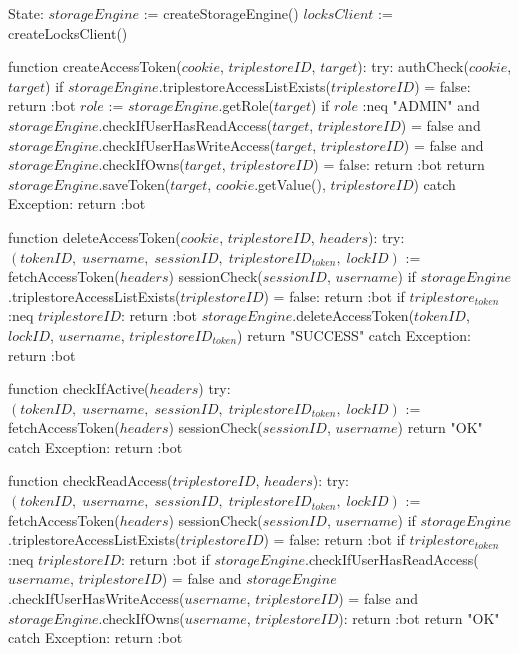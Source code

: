 State:
    $storageEngine$ := createStorageEngine()
    $locksClient$ := createLocksClient()

function createAccessToken($cookie$, $triplestoreID$, $target$):
    try: 
        authCheck($cookie$, $target$)
        if $storageEngine$.triplestoreAccessListExists($triplestoreID$) = false:
            return :bot
        $role$ := $storageEngine$.getRole($target$)
        if $role$ :neq "ADMIN" and $storageEngine$.checkIfUserHasReadAccess($target$, $triplestoreID$) = false and $storageEngine$.checkIfUserHasWriteAccess($target$, $triplestoreID$) = false and $storageEngine$.checkIfOwns($target$, $triplestoreID$) = false:
            return :bot
        return $storageEngine$.saveToken($target$, $cookie$.getValue(), $triplestoreID$)
    catch Exception:
        return :bot

function deleteAccessToken($cookie$, $triplestoreID$, $headers$):
    try: 
        $(tokenID, \; username, \; sessionID, \; triplestoreID_{token}, \; lockID)$ := fetchAccessToken($headers$)
        sessionCheck($sessionID$, $username$)
        if $storageEngine$.triplestoreAccessListExists($triplestoreID$) = false:
            return :bot
        if $triplestore_{token}$ :neq $triplestoreID$:
            return :bot
        $storageEngine$.deleteAccessToken($tokenID$, $lockID$, $username$, $triplestoreID_{token}$)
        return "SUCCESS"
    catch Exception: 
        return :bot

function checkIfActive($headers$) 
    try: 
        $(tokenID, \; username, \; sessionID, \; triplestoreID_{token}, \; lockID)$ := fetchAccessToken($headers$)
        sessionCheck($sessionID$, $username$)
        return "OK"
    catch Exception:
        return :bot

function checkReadAccess($triplestoreID$, $headers$):
    try: 
        $(tokenID, \; username, \; sessionID, \; triplestoreID_{token}, \; lockID)$ := fetchAccessToken($headers$)
        sessionCheck($sessionID$, $username$)
        if $storageEngine$.triplestoreAccessListExists($triplestoreID$) = false:
            return :bot
        if $triplestore_{token}$ :neq $triplestoreID$:
            return :bot
        if $storageEngine$.checkIfUserHasReadAccess($username$, $triplestoreID$) = false and $storageEngine$.checkIfUserHasWriteAccess($username$, $triplestoreID$) = false and $storageEngine$.checkIfOwns($username$, $triplestoreID$):
            return :bot
        return "OK"
    catch Exception: 
        return :bot

